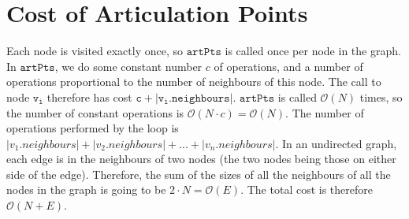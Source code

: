 \documentclass[a4paper,12pt]{article}
\newcommand{\kwa}[1]{\mathtt{#1}}
\begin{document}
\section{Cost of Articulation Points}

Each node is visited exactly once, so $\kwa{artPts}$ is called once per node in the graph. In $\kwa{artPts}$, we do some constant number $c$ of operations, and a number of operations proportional to the number of neighbours of this node. The call to node $\kwa{v_i}$ therefore has cost $\kwa{c + |v_i.neighbours|}$. $\kwa{artPts}$ is called $\mathcal{O}(N)$ times, so the number of constant operations is $\mathcal{O}(N \cdot c) = \mathcal{O}(N)$. The number of operations performed by the loop is $|v_1.neighbours| + |v_2.neighbours| + ... + |v_n.neighbours|$. In an undirected graph, each edge is in the neighbours of two nodes (the two nodes being those on either side of the edge). Therefore, the sum of the sizes of all the neighbours of all the nodes in the graph is going to be $2 \cdot N = \mathcal{O}(E)$. The total cost is therefore $\mathcal{O}(N+E)$.
\end{document}
